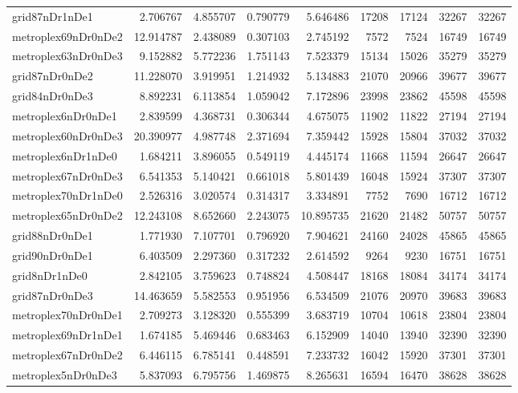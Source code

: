 \begin{longtable}{|l|r|r|r|r|r|r|r|r|}
grid87nDr1nDe1 & 2.706767 & 4.855707 & 0.790779 & 5.646486 & 17208 & 17124 & 32267 & 32267 \\
metroplex69nDr0nDe2 & 12.914787 & 2.438089 & 0.307103 & 2.745192 & 7572 & 7524 & 16749 & 16749 \\
metroplex63nDr0nDe3 & 9.152882 & 5.772236 & 1.751143 & 7.523379 & 15134 & 15026 & 35279 & 35279 \\
grid87nDr0nDe2 & 11.228070 & 3.919951 & 1.214932 & 5.134883 & 21070 & 20966 & 39677 & 39677 \\
grid84nDr0nDe3 & 8.892231 & 6.113854 & 1.059042 & 7.172896 & 23998 & 23862 & 45598 & 45598 \\
metroplex6nDr0nDe1 & 2.839599 & 4.368731 & 0.306344 & 4.675075 & 11902 & 11822 & 27194 & 27194 \\
metroplex60nDr0nDe3 & 20.390977 & 4.987748 & 2.371694 & 7.359442 & 15928 & 15804 & 37032 & 37032 \\
metroplex6nDr1nDe0 & 1.684211 & 3.896055 & 0.549119 & 4.445174 & 11668 & 11594 & 26647 & 26647 \\
metroplex67nDr0nDe3 & 6.541353 & 5.140421 & 0.661018 & 5.801439 & 16048 & 15924 & 37307 & 37307 \\
metroplex70nDr1nDe0 & 2.526316 & 3.020574 & 0.314317 & 3.334891 & 7752 & 7690 & 16712 & 16712 \\
metroplex65nDr0nDe2 & 12.243108 & 8.652660 & 2.243075 & 10.895735 & 21620 & 21482 & 50757 & 50757 \\
grid88nDr0nDe1 & 1.771930 & 7.107701 & 0.796920 & 7.904621 & 24160 & 24028 & 45865 & 45865 \\
grid90nDr0nDe1 & 6.403509 & 2.297360 & 0.317232 & 2.614592 & 9264 & 9230 & 16751 & 16751 \\
grid8nDr1nDe0 & 2.842105 & 3.759623 & 0.748824 & 4.508447 & 18168 & 18084 & 34174 & 34174 \\
grid87nDr0nDe3 & 14.463659 & 5.582553 & 0.951956 & 6.534509 & 21076 & 20970 & 39683 & 39683 \\
metroplex70nDr0nDe1 & 2.709273 & 3.128320 & 0.555399 & 3.683719 & 10704 & 10618 & 23804 & 23804 \\
metroplex69nDr1nDe1 & 1.674185 & 5.469446 & 0.683463 & 6.152909 & 14040 & 13940 & 32390 & 32390 \\
metroplex67nDr0nDe2 & 6.446115 & 6.785141 & 0.448591 & 7.233732 & 16042 & 15920 & 37301 & 37301 \\
metroplex5nDr0nDe3 & 5.837093 & 6.795756 & 1.469875 & 8.265631 & 16594 & 16470 & 38628 & 38628 \\

\end{longtable}
